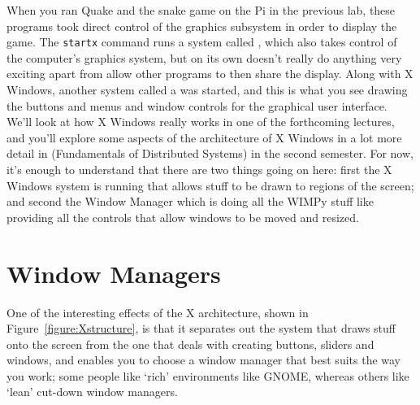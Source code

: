 When you ran Quake and the snake game on the Pi in the previous lab, these programs took direct control of the graphics subsystem in order to display the game. The \texttt{startx} command runs a system called , which also takes control of the computer's graphics system, but on its own doesn't really do anything very exciting apart from allow other programs to then share the display. Along with X Windows, another system called a  was started, and this is what you see drawing the buttons and menus and window controls for the graphical user interface. We'll look at how X Windows really works in one of the forthcoming  lectures, and you'll explore some aspects of the architecture of X Windows in a lot more detail in  (Fundamentals of Distributed Systems) in the second semester. For now, it's enough to understand that there are two things going on here: first the X Windows system is running that allows stuff to be drawn to regions of the screen; and second the Window Manager which is doing all the WIMPy stuff like providing all the controls that allow windows to be moved and resized.


\section{Window Managers}
One of the interesting effects of the X architecture, shown in Figure~\ref{figure:Xstructure}, is that it separates out the system that draws stuff onto the screen from the one that deals with creating buttons, sliders and windows, and enables you to choose a window manager that best suits the way you work; some people like `rich' environments like GNOME, whereas others like `lean' cut-down window managers.

